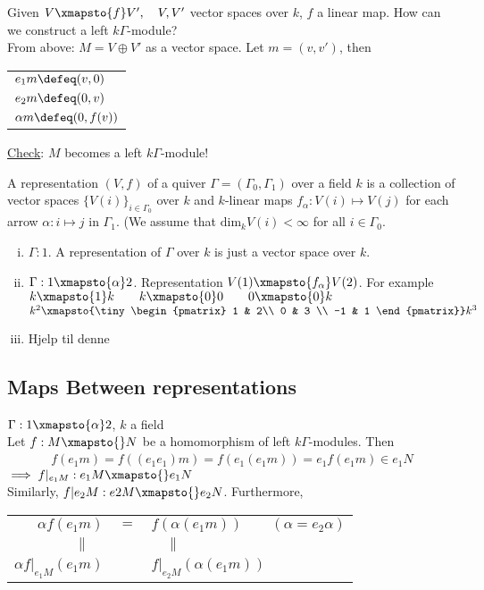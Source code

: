 \noindent Given \(V\xmapsto{f}V',\quad V,V'\) vector spaces over \(k\), \(f\) a linear map. How can we construct a left \(k\Gamma\)-module?\\
From above: \(M = V\oplus V'\) as a vector space. Let \(m = (v, v')\), then\\
\begin{center}
\begin{tabular}{l}
\(e_1m \defeq (v, 0)\)\\
\(e_2m \defeq (0, v)\)\\
\(\alpha m \defeq (0, f(v))\)
\end{tabular}
\end{center}
\underline{Check}: \(M\) becomes a left \(k\Gamma\)-module!
\begin{defin}
A representation \((V, f)\) of a quiver \(\Gamma = (\Gamma_0, \Gamma_1)\) over a field \(k\) is a collection of vector spaces \(\{V(i)\}_{i\in\Gamma_0}\) over \(k\) and \(k\)-linear maps \(f_\alpha:V(i)\mapsto V(j)\) for each arrow \(\alpha: i\mapsto j\) in \(\Gamma_1\). (We assume that \(\text{dim}_kV(i) < \infty\) for all \(i\in\Gamma_0\).
\end{defin}
\begin{exam}
\begin{enumerate}[(i)]
    \item \(\Gamma: 1.\) A representation of \(\Gamma\) over \(k\) is just a vector space over \(k\).
    \item \(\Gamma: 1\xmapsto{\alpha}2\). Representation \(V(1)\xmapsto{f_\alpha}V(2)\). For example \\
    \(k\xmapsto{1}k\quad\quad k\xmapsto{0}0\quad\quad 0\xmapsto{0}k\)\quad\quad
    \(k^2\xmapsto{\tiny\begin{pmatrix} 1 & 2\\ 0 & 3 \\ -1 & 1 \end{pmatrix}}k^3\)
    \item Hjelp til denne 
\end{enumerate}
\end{exam}
\subsection{Maps Between representations}
\begin{exam}
\(\Gamma: 1\xmapsto{\alpha}2\), \(k\) a field\\
Let \(f:M\xmapsto{}N\) be a homomorphism of left \(k\Gamma\)-modules. Then
\begin{align*}
    f(e_1m) = f((e_1e_1)m) = f(e_1(e_1m)) = e_1f(e_1m) \in e_1N
\end{align*}
\(\implies f|_{e_1M}:e_1M \xmapsto{}e_1N\)\\
Similarly, \(f|{e_2M}:e2M\xmapsto{}e_2N\). Furthermore, \\
\begin{tabular}{rcl}
     \(\alpha f(e_1m)\) & \(=\) & \(f(\alpha(e_1m)) \quad\quad (\alpha = e_2\alpha)\) \\
     \(\parallel\quad\) & & \(\quad\parallel\) \\
     \(\alpha f|_{e_1M}(e_1m)\) & & \(f|_{e_2M}(\alpha(e_1m))\)
\end{tabular}
\end{exam}
